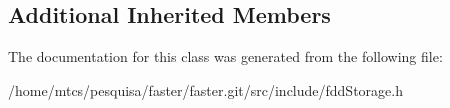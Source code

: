 \subsection*{Additional Inherited Members}


The documentation for this class was generated from the following file\+:\begin{DoxyCompactItemize}
\item 
/home/mtcs/pesquisa/faster/faster.\+git/src/include/fdd\+Storage.\+h\end{DoxyCompactItemize}
